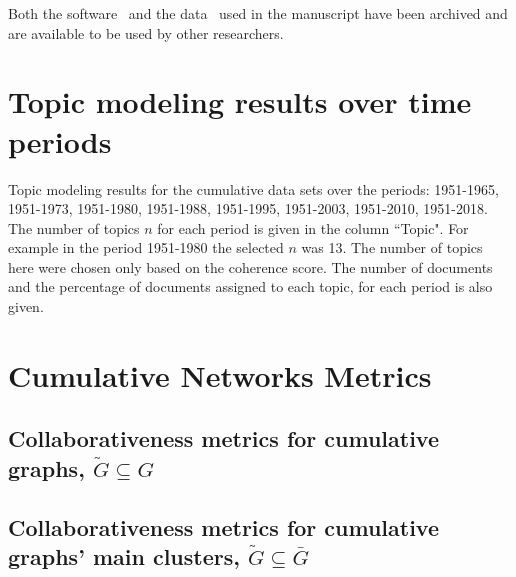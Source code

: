 \documentclass{article}
\theoremstyle{definition}
\begin{document}
Both the software~\cite{nikoleta_2017} and the data~\cite{pd_data_2018} used in
the manuscript have been archived and are available to be used by other
researchers.




\appendix

\section{Topic modeling results over time periods}\label{appendix:topics_per_year}

\begin{table}[!hbtp]
    \begin{center}
    \resizebox{\textwidth}{!}{
    }
    \end{center}
    \caption{Topic modeling results for the cumulative data sets over the
    periods: 1951-1965, 1951-1973, 1951-1980, 1951-1988, 1951-1995, 1951-2003, 1951-2010,
    1951-2018. The number of topics \(n\) for each period is given in the column
    ``Topic". For example in the period 1951-1980 the selected \(n\) was 13. The
    number of topics here were chosen only based on the coherence score.
    The number of documents and the percentage of documents assigned to each
    topic, for each period is also given.}\label{table:topics_per_year}
\end{table}

\section{Cumulative Networks Metrics}\label{appendix:tables}

\subsection{Collaborativeness metrics for cumulative graphs, \(\tilde{G} \subseteq G\)}
\begin{table}[!hbtp]
    \centering
    \resizebox{.8\textwidth}{!}{
    }
\end{table}

\newpage

\subsection{Collaborativeness metrics for cumulative graphs' main clusters, \(\tilde{G} \subseteq \bar{G}\)}
\begin{table}[!hbtp]
    \centering
    \resizebox{.8\textwidth}{!}{
    }
\end{table}
\end{document}
